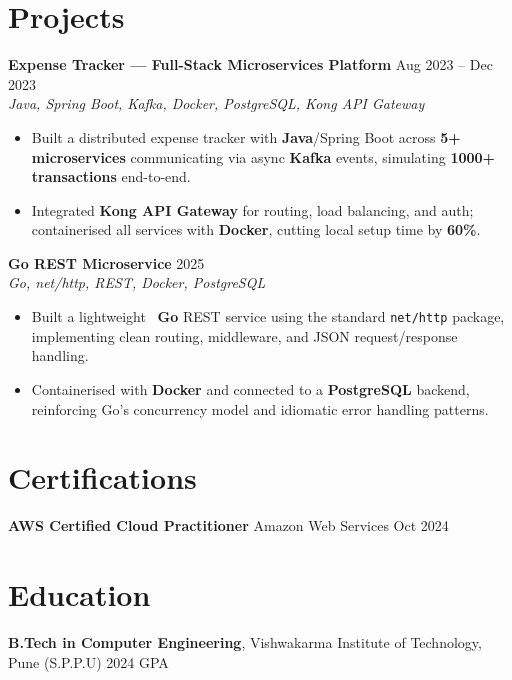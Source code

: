 \documentclass[10pt,letterpaper]{article}
\newcommand{\resumeSubheading}[4]{%
  \textbf{#1} \hfill #2 \\
  \textit{#3} \hfill \textit{#4} \\
}
\begin{document}
\section*{Projects}
\resumeSubheading{Expense Tracker --- Full-Stack Microservices Platform}{Aug 2023 -- Dec 2023}{}{Java, Spring Boot, Kafka, Docker, PostgreSQL, Kong API Gateway}
\begin{itemize}
    \item Built a distributed expense tracker with \textbf{Java}/Spring Boot across \textbf{5+ microservices} communicating via async \textbf{Kafka} events, simulating \textbf{1000+ transactions} end-to-end.
    \item Integrated \textbf{Kong API Gateway} for routing, load balancing, and auth; containerised all services with \textbf{Docker}, cutting local setup time by \textbf{60\%}.
\end{itemize}
\resumeSubheading{Go REST Microservice}{2025}{}{Go, net/http, REST, Docker, PostgreSQL}
\begin{itemize}
    \item Built a lightweight \ \textbf{Go} REST service using the standard \texttt{net/http} package, implementing clean routing, middleware, and JSON request/response handling.
    \item Containerised with \textbf{Docker} and connected to a \textbf{PostgreSQL} backend, reinforcing Go's concurrency model and idiomatic error handling patterns.
\end{itemize}

\section*{Certifications}
\textbf{AWS Certified Cloud Practitioner} \hfill Amazon Web Services \enspace\textbar\enspace Oct 2024

\section*{Education}
\textbf{B.Tech in Computer Engineering}, Vishwakarma Institute of Technology, Pune (S.P.P.U) \hfill 2024 \enspace\textbar{} GPA
\end{document}
